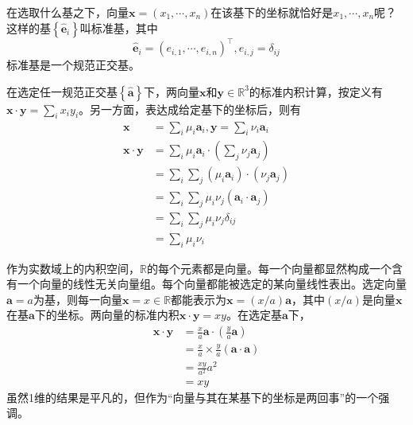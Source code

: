 \documentclass[main.tex]{subfiles}
\begin{document}
\begin{example}
在选取什么基之下，向量$\mathbf{x}=\left(x_1,\cdots,x_n\right)$在该基下的坐标就恰好是$x_1,\cdots,x_n$呢？这样的基$\left\{\mathbf{\hat{e}}_i\right\}$叫标准基，其中
\[\mathbf{\hat{e}}_i=\left(e_{i,1},\cdots,e_{i,n}\right)^\intercal,e_{i,j}=\delta_{ij}\]
标准基是一个规范正交基。

在选定任一规范正交基$\left\{\hat{\mathbf{a}}\right\}$下，两向量$\mathbf{x}$和$\mathbf{y}\in\mathbb{R}^3$的标准内积计算，按定义有$\mathbf{x}\cdot\mathbf{y}=\sum_ix_iy_i$。另一方面，表达成给定基下的坐标后，则有
\begin{align*}
\mathbf{x}&=\sum_i\mu_i\mathbf{a}_i,\mathbf{y}=\sum_i\nu_i\mathbf{a}_i\\
\mathbf{x}\cdot\mathbf{y}&=\sum_i\mu_i\mathbf{a}_i\cdot\left(\sum_j\nu_j\mathbf{a}_j\right)\\
&=\sum_i\sum_j\left(\mu_i\mathbf{a}_i\right)\cdot\left(\nu_j\mathbf{a}_j\right)\\
&=\sum_i\sum_j\mu_i\nu_j\left(\mathbf{a}_i\cdot\mathbf{a}_j\right)\\
&=\sum_i\sum_j\mu_i\nu_j\delta_{ij}\\
&=\sum_i\mu_i\nu_i
\end{align*}
\end{example}

\begin{example}\label{exp:II.3.5}
作为实数域上的内积空间，$\mathbb{R}$的每个元素都是向量。每一个向量都显然构成一个含有一个向量的线性无关向量组。每个向量都能被选定的某向量线性表出。选定向量$\mathbf{a}=a$为基，则每一向量$\mathbf{x}=x\in\mathbb{R}$都能表示为$\mathbf{x}=\left(x/a\right)\mathbf{a}$，其中$\left(x/a\right)$是向量$\mathbf{x}$在基$\mathbf{a}$下的坐标。两向量的标准内积$\mathbf{x}\cdot\mathbf{y}=xy$。在选定基$\mathbf{a}$下，
\begin{align*}
    \mathbf{x}\cdot\mathbf{y}&=\frac{x}{a}\mathbf{a}\cdot\left(\frac{y}{a}\mathbf{a}\right)\\
    &=\frac{x}{a}\times\frac{y}{a}\left(\mathbf{a}\cdot\mathbf{a}\right)\\
    &=\frac{xy}{a^2}a^2\\
    &=xy
\end{align*}
虽然1维的结果是平凡的，但作为“向量与其在某基下的坐标是两回事”的一个强调。
\end{example}
\end{document}
